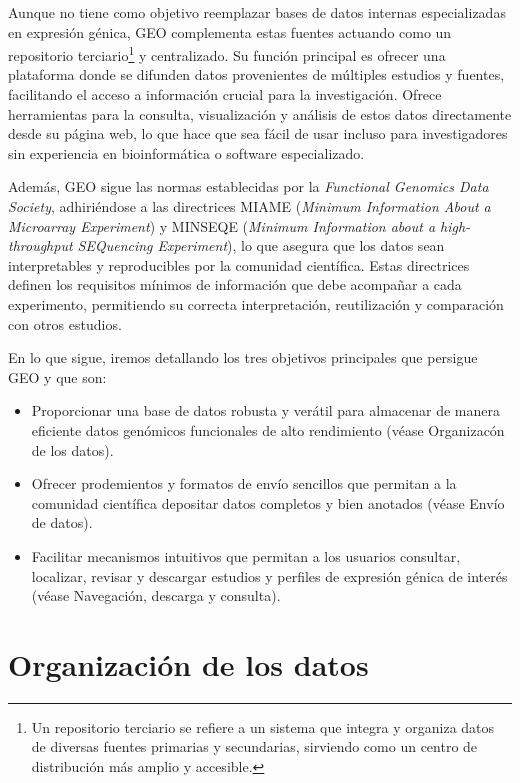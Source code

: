Aunque no tiene como objetivo reemplazar bases de datos internas especializadas en expresión génica, GEO complementa estas fuentes actuando como 
un repositorio terciario\footnote[1]{Un repositorio terciario se refiere a un sistema que integra y organiza datos de diversas 
fuentes primarias y secundarias, sirviendo como un centro de distribución más amplio y accesible.} y centralizado. Su función principal es ofrecer una plataforma 
donde se difunden datos provenientes de múltiples estudios y fuentes, facilitando el acceso a información crucial para la investigación. Ofrece herramientas 
para la consulta, visualización y análisis de estos datos directamente desde su página web, lo que hace que sea fácil de usar incluso para investigadores 
sin experiencia en bioinformática o software especializado.\newline

Además, GEO sigue las normas establecidas por la \textit{Functional Genomics Data Society}, adhiriéndose a las directrices MIAME (\textit{Minimum Information About a Microarray Experiment}) 
y MINSEQE (\textit{Minimum Information about a high-throughput SEQuencing Experiment}), lo que asegura que los datos sean interpretables y reproducibles 
por la comunidad científica. Estas directrices definen los requisitos mínimos de información que debe acompañar a cada experimento, permitiendo 
su correcta interpretación, reutilización y comparación con otros estudios. \newline

En lo que sigue, iremos detallando los tres objetivos principales que persigue GEO y que son:

\begin{itemize}
    \item[1.] Proporcionar una base de datos robusta y verátil para almacenar de manera eficiente datos genómicos funcionales de alto rendimiento
    (véase Organizacón de los datos).
    \item[2.] Ofrecer prodemientos y formatos de envío sencillos que permitan a la comunidad científica depositar datos completos y bien anotados
    (véase Envío de datos).
    \item[3.] Facilitar mecanismos intuitivos que permitan a los usuarios consultar, localizar, revisar y descargar estudios y perfiles de expresión génica
    de interés (véase Navegación, descarga y consulta).
\end{itemize}


\section{Organización de los datos}

